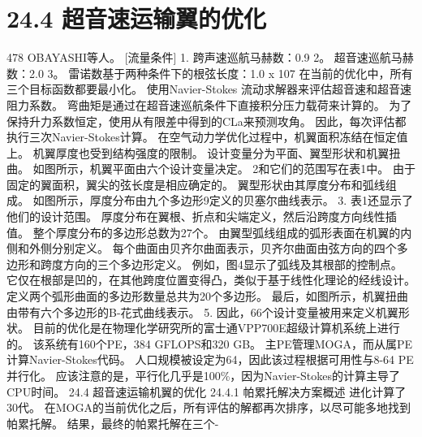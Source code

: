 \documentclass[UTF8,11pt,a4paper,openany,fontset=fandol]{ctexbook}
\begin{document}
\section{24.4 超音速运输翼的优化}
478 OBAYASHI等人。 [流量条件] 1. 跨声速巡航马赫数：0.9 2。 超音速巡航马赫数：2.0 3。 雷诺数基于两种条件下的根弦长度：1.0 x 107 在当前的优化中，所有三个目标函数都要最小化。 使用Navier-Stokes 流动求解器来评估超音速和超音速阻力系数。 弯曲矩是通过在超音速巡航条件下直接积分压力载荷来计算的。 为了保持升力系数恒定，使用从有限差中得到的CLa来预测攻角。 因此，每次评估都执行三次Navier-Stokes计算。 在空气动力学优化过程中，机翼面积冻结在恒定值上。 机翼厚度也受到结构强度的限制。 设计变量分为平面、翼型形状和机翼扭曲。 如图所示，机翼平面由六个设计变量决定。 2和它们的范围写在表1中。 由于固定的翼面积，翼尖的弦长度是相应确定的。 翼型形状由其厚度分布和弧线组成。 如图所示，厚度分布由九个多边形9定义的贝塞尔曲线表示。 3. 表1还显示了他们的设计范围。 厚度分布在翼根、折点和尖端定义，然后沿跨度方向线性插值。 整个厚度分布的多边形总数为27个。 由翼型弧线组成的弧形表面在机翼的内侧和外侧分别定义。 每个曲面由贝齐尔曲面表示，贝齐尔曲面由弦方向的四个多边形和跨度方向的三个多边形定义。 例如，图4显示了弧线及其根部的控制点。 它仅在根部是凹的，在其他跨度位置变得凸，类似于基于线性化理论的经线设计。 定义两个弧形曲面的多边形数量总共为20个多边形。 最后，如图所示，机翼扭曲由带有六个多边形的B-花式曲线表示。 5. 因此，66个设计变量被用来定义机翼形状。 目前的优化是在物理化学研究所的富士通VPP700E超级计算机系统上进行的。 该系统有160个PE，384 GFLOPS和320 GB。 主PE管理MOGA，而从属PE计算Navier-Stokes代码。 人口规模被设定为64，因此该过程根据可用性与8-64 PE并行化。 应该注意的是，平行化几乎是100\%，因为Navier-Stokes的计算主导了CPU时间。 24.4 超音速运输机翼的优化 24.4.1 帕累托解决方案概述 进化计算了30代。 在MOGA的当前优化之后，所有评估的解都再次排序，以尽可能多地找到帕累托解。 结果，最终的帕累托解在三个-
\end{document}
